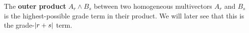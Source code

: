 \begin{definition}\label{d:outer-product1}
	The \textbf{outer product} $A_r \wedge B_s$ between two homogeneous multivectors $A_r$ and $B_s$ is the highest-possible grade term in their product. We will later see that this is the grade-$\left|r+s\right|$ term.
\end{definition}
